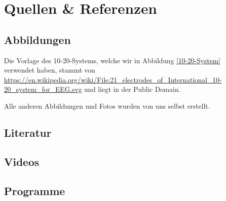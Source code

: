 \documentclass[11pt]{scrartcl}
\begin{document}
	\section{Quellen \& Referenzen}

	\subsection{Abbildungen}

	Die Vorlage des 10-20-Systems, welche wir in Abbildung \ref{10-20-System} verwendet haben, stammt von \url{https://en.wikipedia.org/wiki/File:21_electrodes_of_International_10-20_system_for_EEG.svg} und liegt in der Public Domain.
	
	Alle anderen Abbildungen und Fotos wurden von uns selbst erstellt.

	\subsection{Literatur}
	\printbibliography[heading=none, keyword={Literatur}, notkeyword={YTVideos}]

	\subsection{Videos}
	\printbibliography[heading=none, keyword={YTVideos}]

	\subsection{Programme}
	\printbibliography[heading=none, keyword=Programme]
\end{document}
